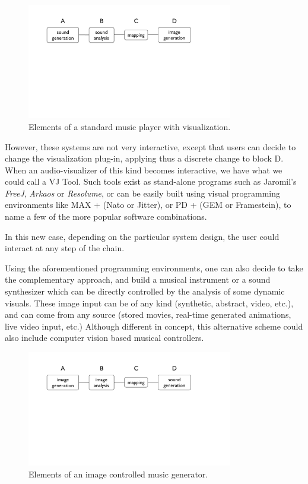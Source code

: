 \begin{figure}[t]
\centering
\includegraphics[width=9cm]{jorda-fig3.pdf}
\caption{Elements of a standard music player with visualization.}
\label{Jorda:fig:music-player} 
\end{figure}

However, these systems are not very interactive, except that users can decide to change the visualization  plug-in,  applying thus a discrete change to block D. When an audio-visualizer  of this kind becomes interactive, we have what we could call a VJ Tool. Such tools exist as stand-alone programs such as Jaromil's \textit{FreeJ}, \textit{Arkaos} or \textit{Resolume}, or can be easily  built using  visual  programming  environments  like MAX + (Nato or Jitter), or PD + (GEM or Framestein), to name a few of the more popular software combinations.

In this new case, depending on the particular system design, the user could
interact at any step of the chain.

Using the aforementioned programming environments, one can also decide to take
the complementary approach, and build a musical instrument or a sound
synthesizer which can be directly controlled by the analysis of some dynamic
visuals. These image input can be of  any  kind  (synthetic,  abstract, video,
etc.), and can come from any source (stored movies, real-time generated
animations, live video input, etc.) Although different in concept, this
alternative scheme could also include computer vision based musical controllers.

\begin{figure}[t]
\centering
\includegraphics[width=9cm]{jorda-fig4.pdf}
\caption{Elements of an image controlled  music generator.}
\label{Jorda:fig:generator} 
\end{figure}

